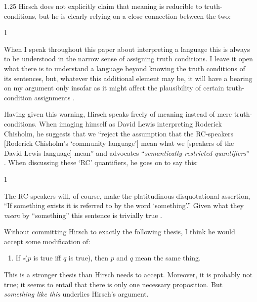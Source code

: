 \documentclass[11pt]{article}
\newenvironment{squote}{%
\begin{spacing}{1}
       	\begin{list}{}{%
\setlength{\labelwidth}{0pt}%
\rightmargin\leftmargin%
}
\item\relax
}{%
\end{list}%
\end{spacing}
}
\begin{document}
\begin{spacing}{1.25}
Hirsch does not explicitly claim that meaning is reducible to
truth-conditions, but he is clearly relying on a close connection
between the two:

\begin{squote}
When I speak throughout this paper about interpreting a language this
is always to be understood in the narrow sense of assigning truth
conditions.  I leave it open what there is to understand a language
beyond knowing the truth conditions of its sentences, but, whatever
this additional element may be, it will have a bearing on my argument
only insofar as it might affect the plausibility of certain
truth-condition assignments \citeyearpar[72]{hirsch2005}.
\end{squote}

Having given this warning, Hirsch speaks freely of meaning instead of
mere truth-conditions.  When imaging himself as David Lewis
interpreting Roderick Chisholm, he suggests that we ``reject the
assumption that the RC-speakers [Roderick Chisholm's `community
  language'] mean what we [speakers of the David Lewis language]
mean'' \citeyearpar[76]{hirsch2005} and advocates ``{\em semantically
  restricted quantifiers}'' \citeyearpar[76, his
  emphasis]{hirsch2005}.  When discussing these `RC' quantifiers, he
goes on to say this:

\begin{squote}
The RC-speakers will, of course, make the platitudinous disquotational
assertion, ``If something exists it is referred to by the word
`something'.''  Given what they {\em mean} by ``something'' this
sentence is trivially true \citeyearpar[77, my emphasis]{hirsch2005}.
\end{squote}

Without committing Hirsch to exactly the following thesis, I think he
would accept some modification of:
\begin{enumerate}[itemindent=25pt, label=(V)]
    \item If $\square$($p$ is true iff $q$ is true), then $p$ and $q$ mean
    the same thing. \label{v}
\end{enumerate}

This is a stronger thesis than Hirsch needs to accept.  Moreover, it
is probably not true; it seems to entail that there is only one
necessary proposition.  But {\em something like this} underlies
Hirsch's argument.


\end{spacing}
\end{document}
